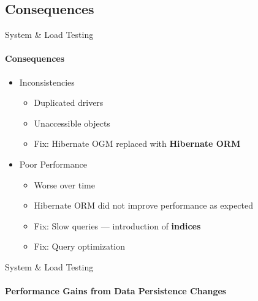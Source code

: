 \subsection{Consequences}
\begin{frame}{System \& Load Testing}
    \framesubtitle{Consequences}
    \begin{itemize}
        \item<1-> Inconsistencies
            \begin{itemize}
                \item Duplicated drivers
                \item Unaccessible objects
                \item Fix: Hibernate OGM replaced with \textbf{Hibernate ORM}
            \end{itemize}
        \item<2-> Poor Performance
            \begin{itemize}
                \item Worse over time
                \item Hibernate ORM did not improve performance as expected
                \item Fix: Slow queries --- introduction of \textbf{indices}
                \item Fix: Query optimization
            \end{itemize}
    \end{itemize}
\end{frame}

\begin{frame}{System \& Load Testing}
    \framesubtitle{Performance Gains from Data Persistence Changes}
    \begin{figure}[htb]
        \centering
    \end{figure}
\end{frame}
